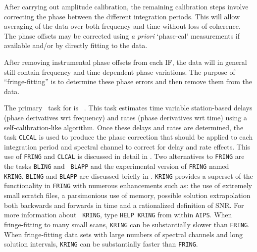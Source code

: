 

After carrying out amplitude calibration, the remaining calibration
steps involve correcting the phase between the different integration periods.
This will allow averaging of the data over both frequency and time
without loss of coherence.  The phase offsets may be corrected using
{\it a priori\/} `phase-cal' measurements if available and/or by
directly fitting to the data.

After removing instrumental phase offsets from each IF, the data
will in general still contain frequency and time dependent phase
variations.  The purpose of ``fringe-fitting'' is to determine these
phase errors and then remove them from the data.

The primary \AIPS\ task for  is {\tt
{}}\@.  This task estimates time variable station-based
delays (phase derivatives wrt frequency) and rates (phase derivatives
wrt time) using a self-calibration-like algorithm.  Once these delays
and rates are determined, the task {\tt CLCAL} is used to produce the
phase correction that should be applied to each integration period and
spectral channel to correct for delay and rate effects.  This use of
{\tt FRING} and {\tt CLCAL} is discussed in detail in \@.
Two alternatives to {\tt FRING} are the tasks {\tt BLING} and {\tt
BLAPP} and the experimental version of {\tt FRING} named {\tt
KRING}\@.  {\tt BLING} and {\tt BLAPP} are discussed briefly in
\@.  {\tt KRING} provides a superset of the functionality
in {\tt FRING} with numerous enhancements such as: the use of
extremely small scratch files, a parsimonious use of memory, possible
solution extrapolation both backwards and forwards in time and a
rationalized definition of SNR\@.  For more information about {\tt
KRING}, type {\tt HELP KRING} from within {\tt AIPS}\@.  When
fringe-fitting to many small scans, {\tt KRING} can be substantially
slower than {\tt FRING}\@.  When fringe-fitting data sets with large
numbers of spectral channels and long solution intervals, {\tt KRING}
can be substantially faster than {\tt FRING}\@.

